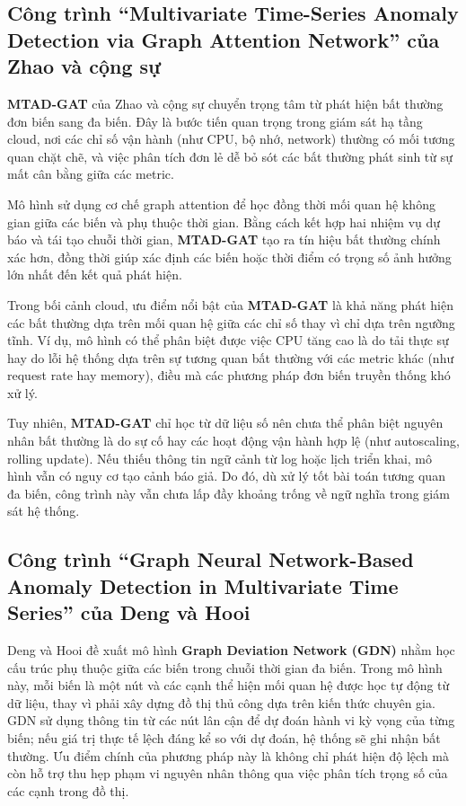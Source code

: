 \subsection*{Công trình “Multivariate Time-Series Anomaly Detection via Graph Attention Network” của Zhao và cộng sự}

\textbf{MTAD-GAT} của Zhao và cộng sự chuyển trọng tâm từ phát hiện bất thường đơn biến sang đa biến. Đây là bước tiến quan trọng trong giám sát hạ tầng cloud, nơi các chỉ số vận hành (như CPU, bộ nhớ, network) thường có mối tương quan chặt chẽ, và việc phân tích đơn lẻ dễ bỏ sót các bất thường phát sinh từ sự mất cân bằng giữa các metric.

Mô hình sử dụng cơ chế graph attention để học đồng thời mối quan hệ không gian giữa các biến và phụ thuộc thời gian. Bằng cách kết hợp hai nhiệm vụ dự báo và tái tạo chuỗi thời gian, \textbf{MTAD-GAT} tạo ra tín hiệu bất thường chính xác hơn, đồng thời giúp xác định các biến hoặc thời điểm có trọng số ảnh hưởng lớn nhất đến kết quả phát hiện.

Trong bối cảnh cloud, ưu điểm nổi bật của \textbf{MTAD-GAT} là khả năng phát hiện các bất thường dựa trên mối quan hệ giữa các chỉ số thay vì chỉ dựa trên ngưỡng tĩnh. Ví dụ, mô hình có thể phân biệt được việc CPU tăng cao là do tải thực sự hay do lỗi hệ thống dựa trên sự tương quan bất thường với các metric khác (như request rate hay memory), điều mà các phương pháp đơn biến truyền thống khó xử lý.

Tuy nhiên, \textbf{MTAD-GAT} chỉ học từ dữ liệu số nên chưa thể phân biệt nguyên nhân bất thường là do sự cố hay các hoạt động vận hành hợp lệ (như autoscaling, rolling update). Nếu thiếu thông tin ngữ cảnh từ log hoặc lịch triển khai, mô hình vẫn có nguy cơ tạo cảnh báo giả. Do đó, dù xử lý tốt bài toán tương quan đa biến, công trình này vẫn chưa lấp đầy khoảng trống về ngữ nghĩa trong giám sát hệ thống.

\subsection*{Công trình “Graph Neural Network-Based Anomaly Detection in Multivariate Time Series” của Deng và Hooi}

Deng và Hooi đề xuất mô hình \textbf{Graph Deviation Network (GDN)} nhằm học cấu trúc phụ thuộc giữa các biến trong chuỗi thời gian đa biến. Trong mô hình này, mỗi biến là một nút và các cạnh thể hiện mối quan hệ được học tự động từ dữ liệu, thay vì phải xây dựng đồ thị thủ công dựa trên kiến thức chuyên gia. GDN sử dụng thông tin từ các nút lân cận để dự đoán hành vi kỳ vọng của từng biến; nếu giá trị thực tế lệch đáng kể so với dự đoán, hệ thống sẽ ghi nhận bất thường. Ưu điểm chính của phương pháp này là không chỉ phát hiện độ lệch mà còn hỗ trợ thu hẹp phạm vi nguyên nhân thông qua việc phân tích trọng số của các cạnh trong đồ thị.

